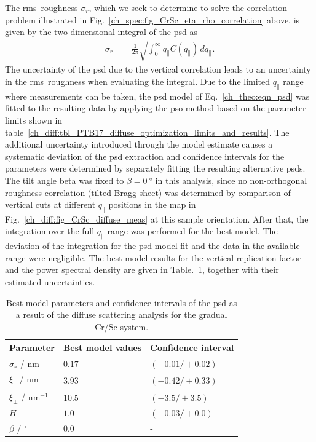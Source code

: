 The \gls{rms}~roughness $\sigma_r$, which we seek to determine to solve the correlation problem illustrated in Fig.~\ref{ch_spec:fig_CrSc_eta_rho_correlation} above, is given by the two-dimensional integral of the \gls{psd} as
\begin{align}
\sigma_r &=\frac{1}{2\pi} \sqrt{\int_{0}^{\infty} q_\parallel C(q_\parallel) \, 
dq_\parallel} \text{.}
\end{align}
The uncertainty of the \gls{psd} due to the vertical correlation leads to an 
uncertainty in the \gls{rms}~roughness when evaluating the integral. Due to the 
limited $q_\parallel$ range where measurements can be taken, the 
\gls{psd} model of Eq.~\eqref{ch_theo:eqn_psd} was fitted to the resulting data by applying the \gls{pso} method based on the parameter limits shown in table~\ref{ch_diff:tbl_PTB17_diffuse_optimization_limits_and_results}. The additional uncertainty introduced through the model estimate causes a systematic deviation of the \gls{psd} extraction and confidence intervals for the parameters were determined by separately fitting the resulting alternative \gls{psd}s. The tilt angle beta was fixed to $\beta=\SI{0}{\degree}$ in this analysis, since no non-orthogonal roughness correlation (tilted Bragg sheet) was determined by comparison of vertical cuts at different $q_\parallel$ positions in the map in Fig.~\ref{ch_diff:fig_CrSc_diffuse_meas} at this sample orientation. After that, the integration over the full $q_\parallel$ range was performed for the best model. The deviation of the integration for the \gls{psd} model fit and the data in the available range were negligible. The best model results for the vertical replication factor and the power spectral 
density are given in Table.~\ref{ch_diff:tbl_CrSc_psd_results}, together with their estimated
uncertainties.
\begin{table}
\centering
\caption[Best model parameters and confidence intervals of the PSD for the gradual Cr/Sc system.]{Best model parameters and confidence intervals of the \gls{psd} as a result of the diffuse scattering analysis for the gradual Cr/Sc system.}
\label{ch_diff:tbl_CrSc_psd_results}
\begin{tabular}{@{}lll@{}}
\toprule
Parameter & Best model values & Confidence interval\\ \midrule
$\sigma_r$ / nm & $0.17  $&$(-0.01/+0.02)$ \\
$\xi_\parallel$ / nm& $3.93 $&$(-0.42 / +0.33)$ \\
$\xi_\perp$  / nm$^{-1}$& $10.5 $&$ (-3.5/+3.5)$ \\
$H$ & $1.0$ & $(-0.03 /+0.0)$ \\
$\beta$ / $^\circ$ & $0.0$ & - \\
 \bottomrule
\end{tabular}
\end{table}

